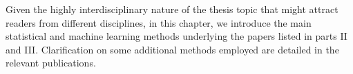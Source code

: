 Given the highly interdisciplinary nature of the thesis topic that might attract readers from different disciplines, in this chapter, we introduce the main statistical and machine learning methods underlying the papers listed in parts II and III. Clarification on some additional methods employed are detailed in the relevant publications.